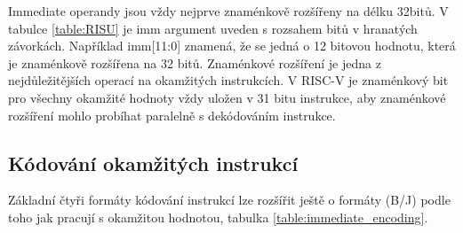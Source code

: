\documentclass[FM,BP]{tulthesis}
\begin{document}
Immediate operandy jsou vždy nejprve znaménkově rozšířeny na délku 32bitů. V tabulce \ref{table:RISU} je imm argument uveden s rozsahem bitů v hranatých závorkách. Například imm[11:0] znamená, že se jedná o 12 bitovou hodnotu, která je znaménkově rozšířena na 32 bitů.
Znaménkové rozšíření je jedna z nejdůležitějších operací na okamžitých instrukcích. V RISC-V je znaménkový bit pro všechny okamžité hodnoty vždy uložen v 31 bitu instrukce, aby znaménkové rozšíření mohlo probíhat paralelně s dekódováním instrukce.

\subsection{Kódování okamžitých instrukcí}
Základní čtyři formáty kódování instrukcí lze rozšířit ještě o formáty (B/J) podle toho jak pracují s okamžitou hodnotou, tabulka \ref{table:immediate_encoding}. 
\end{document}
